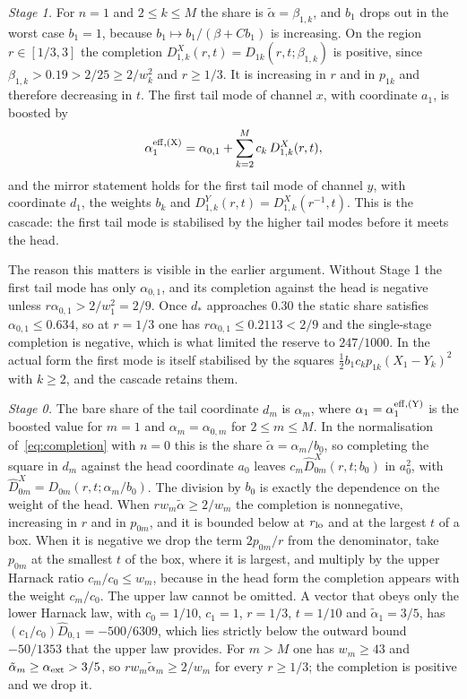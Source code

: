 \documentclass[10pt]{article}
\theoremstyle{remark}
\newcommand{\dstar}{d_{*}}
\begin{document}
\emph{Stage 1.} For $n=1$ and $2\le k\le M$ the share is $\tilde\alpha=\beta_{1,k}$, and $b_1$ drops out in the worst case $b_1=1$, because $b_1\mapsto b_1/(\beta+Cb_1)$ is increasing. On the region $r\in[1/3,3]$ the completion $D^{X}_{1,k}(r,t)=D_{1k}(r,t;\beta_{1,k})$ is positive, since $\beta_{1,k}>0.19>2/25\ge2/w_k^2$ and $r\ge1/3$. It is increasing in $r$ and in $p_{1k}$ and therefore decreasing in $t$. The first tail mode of channel $x$, with coordinate $a_1$, is boosted by
\[
\alpha_1^{\rm eff,(X)}=\alpha_{0,1}+\sum_{k=2}^{M}c_k\,D^{X}_{1,k}(r,t),
\]
and the mirror statement holds for the first tail mode of channel $y$, with coordinate $d_1$, the weights $b_k$ and $D^Y_{1,k}(r,t)=D^X_{1,k}(r^{-1},t)$. This is the cascade: the first tail mode is stabilised by the higher tail modes before it meets the head.

The reason this matters is visible in the earlier argument. Without Stage 1 the first tail mode has only $\alpha_{0,1}$, and its completion against the head is negative unless $r\alpha_{0,1}>2/w_1^2=2/9$. Once $\dstar$ approaches $0.30$ the static share satisfies $\alpha_{0,1}\le0.634$, so at $r=1/3$ one has $r\alpha_{0,1}\le0.2113<2/9$ and the single-stage completion is negative, which is what limited the reserve to $247/1000$. In the actual form the first mode is itself stabilised by the squares $\tfrac12b_1c_kp_{1k}(X_1-Y_k)^2$ with $k\ge2$, and the cascade retains them.

\emph{Stage 0.} The bare share of the tail coordinate $d_m$ is $\alpha_m$, where $\alpha_1=\alpha_1^{\rm eff,(Y)}$ is the boosted value for $m=1$ and $\alpha_m=\alpha_{0,m}$ for $2\le m\le M$. In the normalisation of~\eqref{eq:completion} with $n=0$ this is the share $\tilde\alpha=\alpha_m/b_0$, so completing the square in $d_m$ against the head coordinate $a_0$ leaves $c_m\hat D^{X}_{0m}(r,t;b_0)$ in $a_0^2$, with $\hat D^{X}_{0m}=D_{0m}(r,t;\alpha_m/b_0)$. The division by $b_0$ is exactly the dependence on the weight of the head. When $rw_m\tilde\alpha\ge2/w_m$ the completion is nonnegative, increasing in $r$ and in $p_{0m}$, and it is bounded below at $r_{\rm lo}$ and at the largest $t$ of a box. When it is negative we drop the term $2p_{0m}/r$ from the denominator, take $p_{0m}$ at the smallest $t$ of the box, where it is largest, and multiply by the upper Harnack ratio $c_m/c_0\le w_m$, because in the head form the completion appears with the weight $c_m/c_0$. The upper law cannot be omitted. A vector that obeys only the lower Harnack law, with $c_0=1/10$, $c_1=1$, $r=1/3$, $t=1/10$ and $\tilde\alpha_1=3/5$, has $(c_1/c_0)\hat D_{0,1}=-500/6309$, which lies strictly below the outward bound $-50/1353$ that the upper law provides. For $m>M$ one has $w_m\ge43$ and $\tilde\alpha_m\ge\alpha_{\rm ext}>3/5$, so $rw_m\tilde\alpha_m\ge2/w_m$ for every $r\ge1/3$; the completion is positive and we drop it.
\end{document}
